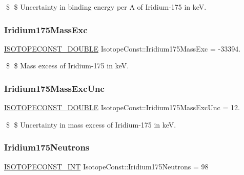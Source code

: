 \$ \$ Uncertainty in binding energy per A of Iridium-\/175 in keV. \mbox{\label{group___isotope_const-_iridium-_ir175_ga9cc9f62ad4c65c8a82bfaaaa0829ba2b}} 
\subsubsection{\texorpdfstring{Iridium175\+Mass\+Exc}{Iridium175MassExc}}
{\footnotesize\ttfamily \mbox{\hyperlink{group___isotope_const-_macros_ga8f45a7272ce02c0b4c65c44636ed719a}{I\+S\+O\+T\+O\+P\+E\+C\+O\+N\+S\+T\+\_\+\+D\+O\+U\+B\+LE}} Isotope\+Const\+::\+Iridium175\+Mass\+Exc = -\/33394.}

\$ \$ Mass excess of Iridium-\/175 in keV. \mbox{\label{group___isotope_const-_iridium-_ir175_gab98e5152a397530f7dd3ab5fdef52fc8}} 
\subsubsection{\texorpdfstring{Iridium175\+Mass\+Exc\+Unc}{Iridium175MassExcUnc}}
{\footnotesize\ttfamily \mbox{\hyperlink{group___isotope_const-_macros_ga8f45a7272ce02c0b4c65c44636ed719a}{I\+S\+O\+T\+O\+P\+E\+C\+O\+N\+S\+T\+\_\+\+D\+O\+U\+B\+LE}} Isotope\+Const\+::\+Iridium175\+Mass\+Exc\+Unc = 12.}

\$ \$ Uncertainty in mass excess of Iridium-\/175 in keV. \mbox{\label{group___isotope_const-_iridium-_ir175_gac766e70207f15dcc6a1ca816da71262c}} 
\subsubsection{\texorpdfstring{Iridium175\+Neutrons}{Iridium175Neutrons}}
{\footnotesize\ttfamily \mbox{\hyperlink{group___isotope_const-_macros_ga5f18360b3e99483a35c32d789e62621c}{I\+S\+O\+T\+O\+P\+E\+C\+O\+N\+S\+T\+\_\+\+I\+NT}} Isotope\+Const\+::\+Iridium175\+Neutrons = 98}

